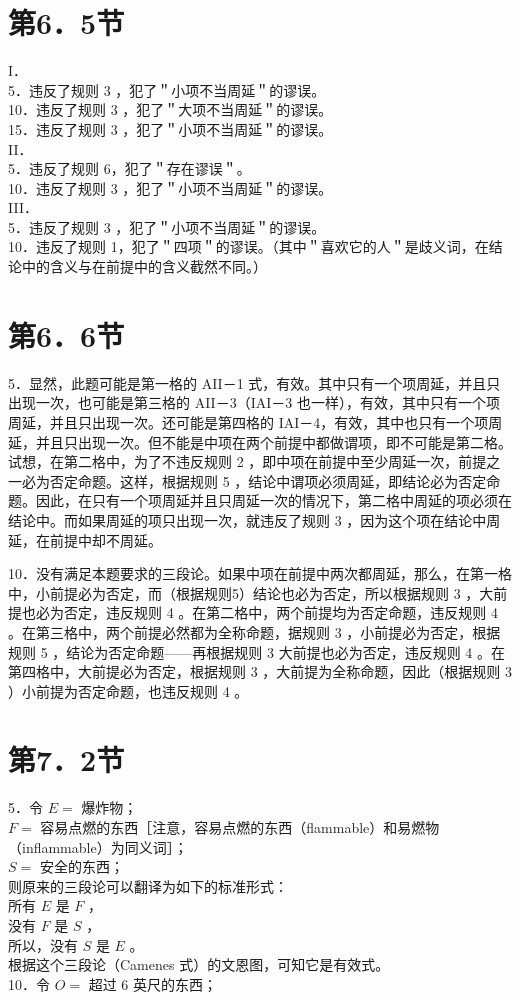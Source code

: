 \section*{第6．5节}
I．\\
5．违反了规则 3 ，犯了＂小项不当周延＂的谬误。\\
10．违反了规则 3 ，犯了＂大项不当周延＂的谬误。\\
15．违反了规则 3 ，犯了＂小项不当周延＂的谬误。\\
II．\\
5．违反了规则 6，犯了＂存在谬误＂。\\
10．违反了规则 3 ，犯了＂小项不当周延＂的谬误。\\
III．\\
5．违反了规则 3 ，犯了＂小项不当周延＂的谬误。\\
10．违反了规则 1，犯了＂四项＂的谬误。（其中＂喜欢它的人＂是歧义词，在结论中的含义与在前提中的含义截然不同。）

\section*{第6．6节}
5．显然，此题可能是第一格的 AII－1 式，有效。其中只有一个项周延，并且只出现一次，也可能是第三格的 AII－3（IAI－3 也一样），有效，其中只有一个项周延，并且只出现一次。还可能是第四格的 IAI－4，有效，其中也只有一个项周延，并且只出现一次。但不能是中项在两个前提中都做谓项，即不可能是第二格。试想，在第二格中，为了不违反规则 2 ，即中项在前提中至少周延一次，前提之一必为否定命题。这样，根据规则 5 ，结论中谓项必须周延，即结论必为否定命题。因此，在只有一个项周延并且只周延一次的情况下，第二格中周延的项必须在结论中。而如果周延的项只出现一次，就违反了规则 3 ，因为这个项在结论中周延，在前提中却不周延。

10．没有满足本题要求的三段论。如果中项在前提中两次都周延，那么，在第一格中，小前提必为否定，而（根据规则5）结论也必为否定，所以根据规则 3 ，大前提也必为否定，违反规则 4 。在第二格中，两个前提均为否定命题，违反规则 4 。在第三格中，两个前提必然都为全称命题，据规则 3 ，小前提必为否定，根据规则 5 ，结论为否定命题——再根据规则 3 大前提也必为否定，违反规则 4 。在第四格中，大前提必为否定，根据规则 3 ，大前提为全称命题，因此（根据规则 3 ）小前提为否定命题，也违反规则 4 。

\section*{第7．2节}
5．令 $E=$ 爆炸物；\\
$F=$ 容易点燃的东西［注意，容易点燃的东西（flammable）和易燃物（inflammable）为同义词］；\\
$S=$ 安全的东西；\\
则原来的三段论可以翻译为如下的标准形式：\\
所有 $E$ 是 $F$ ，\\
没有 $F$ 是 $S$ ，\\
所以，没有 $S$ 是 $E$ 。\\
根据这个三段论（Camenes 式）的文恩图，可知它是有效式。\\
10．令 $O=$ 超过 6 英尺的东西；

